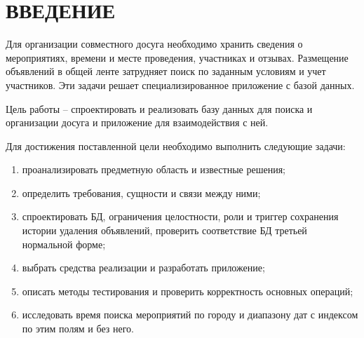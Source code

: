 \chapter*{ВВЕДЕНИЕ}

Для организации совместного досуга необходимо хранить сведения о мероприятиях, времени и месте проведения, участниках и отзывах. Размещение объявлений в общей ленте затрудняет поиск по заданным условиям и учет участников. Эти задачи решает специализированное приложение с базой данных.

Цель работы -- спроектировать и реализовать базу данных для поиска и организации досуга и приложение для взаимодействия с ней.

Для достижения поставленной цели необходимо выполнить следующие задачи:
\begin{enumerate}[label=\arabic*)]
    \item проанализировать предметную область и известные решения;
    \item определить требования, сущности и связи между ними;
    \item спроектировать БД, ограничения целостности, роли и триггер сохранения истории удаления объявлений, проверить соответствие БД третьей нормальной форме;
    \item выбрать средства реализации и разработать приложение;
    \item описать методы тестирования и проверить корректность основных операций;
    \item исследовать время поиска мероприятий по городу и диапазону дат с индексом по этим полям и без него.
\end{enumerate}
